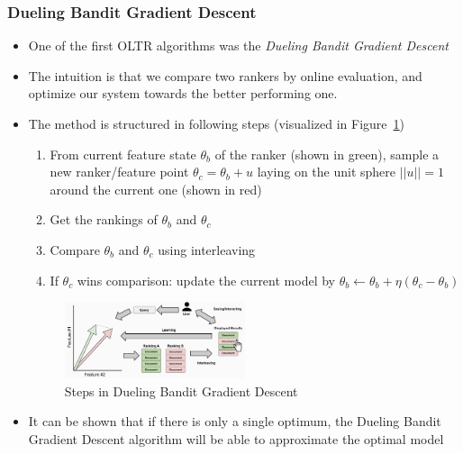 \subsubsection{Dueling Bandit Gradient Descent}
\begin{itemize}
	\item One of the first OLTR algorithms was the \textit{Dueling Bandit Gradient Descent}
	\item The intuition is that we compare two rankers by online evaluation, and optimize our system towards the better performing one.
	\item The method is structured in following steps (visualized in Figure~\ref{img:learning_to_rank_online_DBGD})
	\begin{enumerate}
		\item From current feature state $\theta_b$ of the ranker (shown in green), sample a new ranker/feature point $\theta_c = \theta_b + u$ laying on the unit sphere $||u||=1$ around the current one (shown in red)
		\item Get the rankings of $\theta_b$ and $\theta_c$
		\item Compare $\theta_b$ and $\theta_c$ using interleaving
		\item If $\theta_c$ wins comparison: update the current model by $\theta_b \leftarrow \theta_b + \eta (\theta_c - \theta_b)$
	\end{enumerate}
	\begin{figure}[ht]
		\centering
		\includegraphics[width=0.5\textwidth]{figures/learning_to_rank_online_DBGD.png}
		\caption{Steps in Dueling Bandit Gradient Descent}
		\label{img:learning_to_rank_online_DBGD}
	\end{figure}
	\item It can be shown that if there is only a single optimum, the Dueling Bandit Gradient Descent algorithm will be able to approximate the optimal model
\end{itemize}